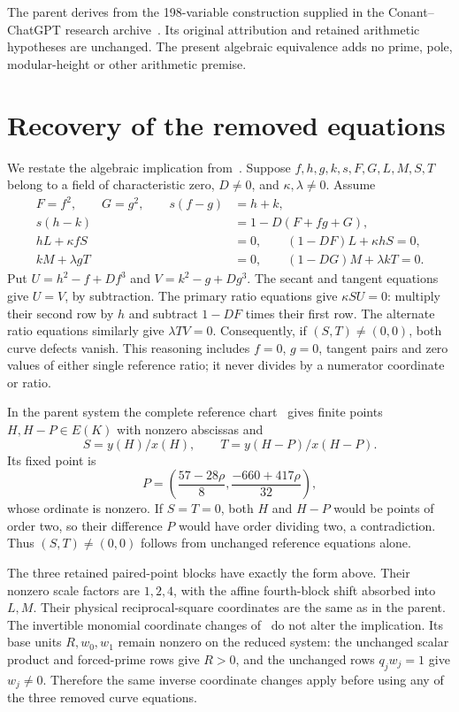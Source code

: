 \documentclass[11pt,a4paper]{article}
\begin{document}
The parent derives from the 198-variable construction supplied in the
Conant--ChatGPT research archive~\cite{Archive}. Its original attribution
and retained arithmetic hypotheses are unchanged. The present algebraic
equivalence adds no prime, pole, modular-height or other arithmetic premise.

\section{Recovery of the removed equations}
We restate the algebraic implication from~\cite{Paired}. Suppose
$f,h,g,k,s,F,G,L,M,S,T$ belong to a field of characteristic zero,
$D\ne0$, and $\kappa,\lambda\ne0$. Assume
\begin{align*}
 F=f^2,\qquad G=g^2,\qquad
 s(f-g)&=h+k,\\
 s(h-k)&=1-D(F+fg+G),\\
 hL+\kappa fS&=0,\qquad (1-DF)L+\kappa hS=0,\\
 kM+\lambda gT&=0,\qquad (1-DG)M+\lambda kT=0.
\end{align*}
Put $U=h^2-f+Df^3$ and $V=k^2-g+Dg^3$.
The secant and tangent equations give $U=V$, by subtraction.
The primary ratio equations give $\kappa S U=0$:
multiply their second row by $h$ and subtract $1-DF$ times their
first row. The alternate ratio equations similarly give
$\lambda T V=0$. Consequently, if $(S,T)\ne(0,0)$, both
curve defects vanish. This reasoning includes $f=0$, $g=0$, tangent
pairs and zero values of either single reference ratio; it never divides
by a numerator coordinate or ratio.

In the parent system the complete reference chart~\cite{Reference}
gives finite points $H,H-P\in E(K)$ with nonzero abscissas and
\[
 S=y(H)/x(H),\qquad T=y(H-P)/x(H-P).
\]
Its fixed point is
\[
 P=\left(\frac{57-28\rho}{8},\frac{-660+417\rho}{32}\right),
\]
whose ordinate is nonzero. If $S=T=0$, both $H$ and $H-P$ would
be points of order two, so their difference $P$ would have order
dividing two, a contradiction. Thus $(S,T)\ne(0,0)$ follows from
unchanged reference equations alone.

The three retained paired-point blocks have exactly the form above.
Their nonzero scale factors are $1,2,4$, with the affine fourth-block
shift absorbed into $L,M$. Their physical reciprocal-square coordinates
are the same as in the parent. The invertible monomial coordinate changes
of~\cite{Laurent} do not alter the implication. Its base units $R,w_0,w_1$
remain nonzero on the reduced system: the unchanged scalar product and
forced-prime rows give $R>0$, and the unchanged rows $q_jw_j=1$ give
$w_j\ne0$. Therefore the same inverse coordinate changes apply before
using any of the three removed curve equations.
\end{document}

